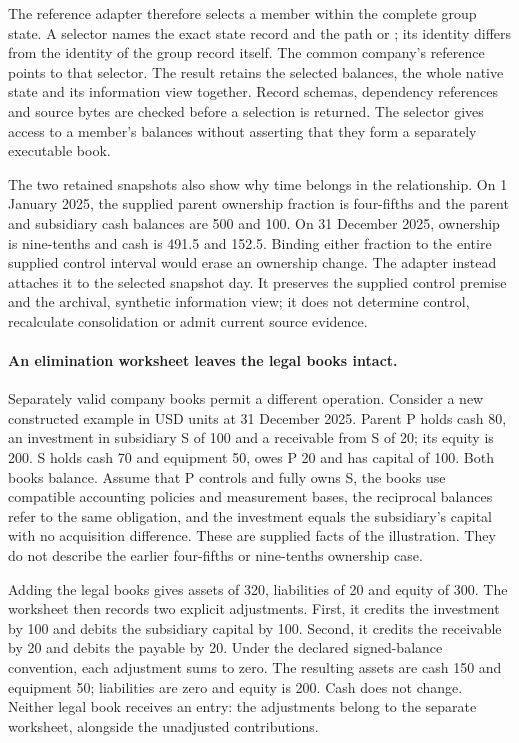 The reference adapter therefore selects a member within the complete group
state. A selector names the exact state record and the path
 or ; its identity differs from the identity of
the group record itself. The common company's reference points to that
selector. The result retains the selected balances, the whole native state
and its information view together. Record schemas, dependency references and
source bytes are checked before a selection is returned. The selector gives
access to a member's balances without asserting that they form a separately
executable book.

The two retained snapshots also show why time belongs in the relationship.
On 1 January 2025, the supplied parent ownership fraction is four-fifths and
the parent and subsidiary cash balances are 500 and 100. On 31 December 2025,
ownership is nine-tenths and cash is 491.5 and 152.5. Binding either fraction
to the entire supplied control interval would erase an ownership change.
The adapter instead attaches it to the selected snapshot day. It preserves
the supplied control premise and the archival, synthetic information view;
it does not determine control, recalculate consolidation or admit current
source evidence.

\paragraph{An elimination worksheet leaves the legal books intact.}
Separately valid company books permit a different operation. Consider a new
constructed example in USD units at 31 December 2025. Parent P holds cash 80,
an investment in subsidiary S of 100 and a receivable from S of 20; its equity
is 200. S holds cash 70 and equipment 50, owes P 20 and has capital of 100.
Both books balance. Assume that P controls and fully owns S, the books use
compatible accounting policies and measurement bases, the reciprocal balances
refer to the same obligation, and the investment equals the subsidiary's
capital with no acquisition difference. These are supplied facts of the
illustration. They do not describe the earlier four-fifths or nine-tenths
ownership case.

Adding the legal books gives assets of 320, liabilities of 20 and equity of
300. The worksheet then records two explicit adjustments. First, it credits
the investment by 100 and debits the subsidiary capital by 100. Second, it
credits the receivable by 20 and debits the payable by 20. Under the declared
signed-balance convention, each adjustment sums to zero. The resulting assets
are cash 150 and equipment 50; liabilities are zero and equity is 200. Cash
does not change. Neither legal book receives an entry: the adjustments belong
to the separate worksheet, alongside the unadjusted contributions.

